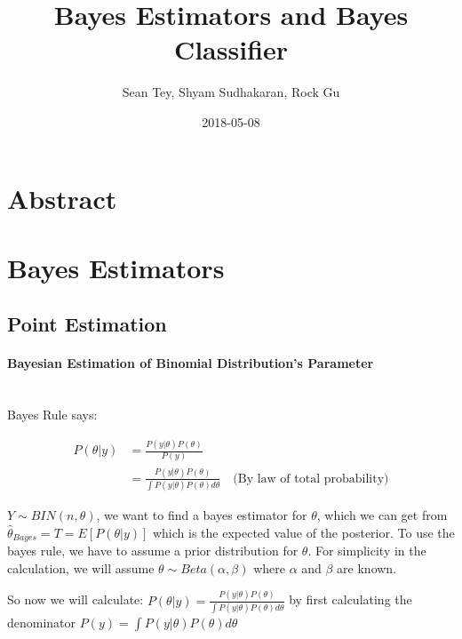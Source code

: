 \documentclass{article}
\title{Bayes Estimators and Bayes Classifier}
\date{2018-05-08}
\author{Sean Tey, Shyam Sudhakaran, Rock Gu}
\begin{document}

\maketitle
\newpage

\doublespacing
\tableofcontents
\singlespacing

\newpage


\section{Abstract}

\newpage

\section{Bayes Estimators}

\subsection{Point Estimation}

\paragraph{Bayesian Estimation of Binomial Distribution's Parameter}\mbox{}\\

Bayes Rule says:

\begin{align*} 
P(\theta|y) &= \frac{P(y|\theta)P(\theta)}{P(y)} \\
&= \frac{P(y|\theta)P(\theta)}{\int P(y|\theta)P(\theta) d\theta} \quad \text{(By law of total probability)}
\end{align*}

$Y \sim BIN(n,\theta)$, we want to find a bayes estimator for $\theta$, which we can get from\\ $\hat{\theta}_{Bayes} = T = E[P(\theta|y)]$ which is the expected value of the posterior. To use the bayes rule, we have to assume a prior distribution for $\theta$. For simplicity in the calculation, we will assume $\theta \sim Beta(\alpha,\beta)$ where $\alpha$ and $\beta$ are known.\newline

\noindent So now we will calculate: $P(\theta|y) = \frac{P(y|\theta)P(\theta)}{\int P(y|\theta)P(\theta) d\theta}$ by first calculating the denominator $P(y) = \int P(y|\theta)P(\theta) d\theta$
\end{document}
